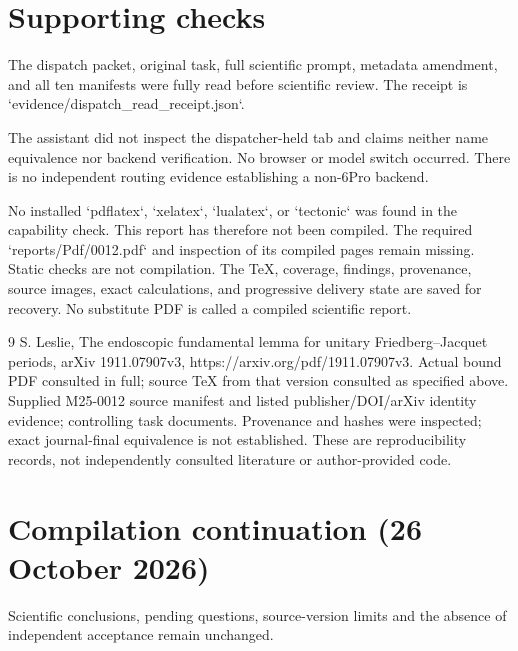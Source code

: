 \documentclass[10pt]{article}
\begin{document}
\section*{Supporting checks}
The dispatch packet, original task, full scientific prompt, metadata amendment, and all ten manifests were fully read before scientific review. The receipt is `evidence/dispatch\_read\_receipt.json`.\par
The assistant did not inspect the dispatcher-held tab and claims neither name equivalence nor backend verification. No browser or model switch occurred. There is no independent routing evidence establishing a non-6Pro backend.\par
No installed `pdflatex`, `xelatex`, `lualatex`, or `tectonic` was found in the capability check. This report has therefore not been compiled. The required `reports/Pdf/0012.pdf` and inspection of its compiled pages remain missing. Static checks are not compilation. The TeX, coverage, findings, provenance, source images, exact calculations, and progressive delivery state are saved for recovery. No substitute PDF is called a compiled scientific report.\par
9 S. Leslie, The endoscopic fundamental lemma for unitary Friedberg–Jacquet periods, arXiv 1911.07907v3, https://arxiv.org/pdf/1911.07907v3. Actual bound PDF consulted in full; source TeX from that version consulted as specified above. Supplied M25-0012 source manifest and listed publisher/DOI/arXiv identity evidence; controlling task documents. Provenance and hashes were inspected; exact journal-final equivalence is not established. These are reproducibility records, not independently consulted literature or author-provided code.\par
\section*{Compilation continuation (26 October 2026)}
Scientific conclusions, pending questions, source-version limits and the absence of independent acceptance remain unchanged.\par
\end{document}
